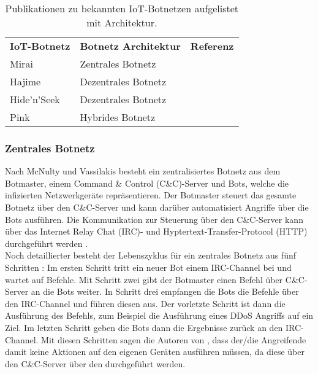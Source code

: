 \begin{center}
\begin{table}[ht]
    \begin{center}
    \begin{tabular}{p{2cm} m{5cm} c}
       \textbf{IoT-Botnetz} & \textbf{Botnetz Architektur} & \textbf{Referenz} \\
       \Xhline{4\arrayrulewidth}
        Mirai & Zentrales Botnetz & \cite{DBLP:conf/uss/AntonakakisABBB17,DBLP:journals/computer/KoliasKSV17,DBLP:journals/di/ZhangUBC20} \\
        \hline
        Hajime & Dezentrales Botnetz & \cite{DBLP:journals/tdsc/WangSZ10} \\
        \hline
        Hide'n'Seek & Dezentrales Botnetz & \cite{Diaconescu2018HIDENSEEKAA} \\
        \hline
        Pink & Hybrides Botnetz & \cite{DBLP:conf/colcom/WangSZLGD22} \\
        \hline
    \end{tabular}
    \end{center}
    \caption{Publikationen zu bekannten IoT-Botnetzen aufgelistet mit Architektur.}
    \label{tab:botnet_paper}
\end{table}
\end{center}

\subsubsection{Zentrales Botnetz}

Nach McNulty und Vassilakis \cite{DBLP:conf/csndsp/McNultyV22} besteht ein zentralisiertes Botnetz aus dem Botmaster, einem Command \& Control (C\&C)-Server und Bots, welche die infizierten Netzwerkgeräte repräsentieren. Der Botmaster steuert das gesamte Botnetz über den C\&C-Server und kann darüber automatisiert Angriffe über die Bots ausführen. Die Kommunikation zur Steuerung über den C\&C-Server kann über das Internet Relay Chat (IRC)- und Hyptertext-Transfer-Protocol (HTTP) durchgeführt werden \cite{Wazzan2021InternetOT}. \\[0.2in] 

Noch detaillierter besteht der Lebenszyklus für ein zentrales Botnetz aus fünf Schritten \cite{SCHILLER200729}: Im ersten Schritt tritt ein neuer Bot einem IRC-Channel bei und wartet auf Befehle. Mit Schritt zwei gibt der Botmaster einen Befehl über C\&C-Server an die Bots weiter. In Schritt drei empfangen die Bots die Befehle über den IRC-Channel und führen diesen aus. Der vorletzte Schritt ist dann die Ausführung des Befehls, zum Beispiel die Ausführung eines DDoS Angriffs auf ein Ziel. Im letzten Schritt geben die Bots dann die Ergebnisse zurück an den IRC-Channel. Mit diesen Schritten sagen die Autoren von \cite{SCHILLER200729}, dass der/die Angreifende damit keine Aktionen auf den eigenen Geräten ausführen müssen, da diese über den C\&C-Server über den durchgeführt werden. \\[0.2in]


